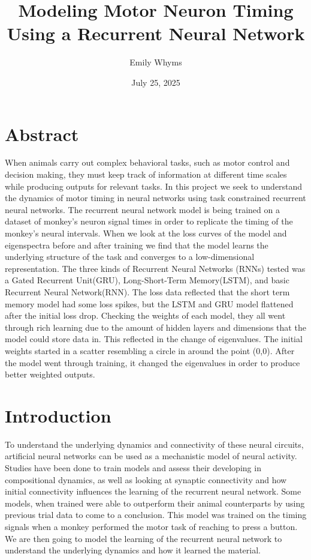 \documentclass{article}
\title{\bf \fontsize{25 pt}{25 pt} Modeling Motor Neuron Timing Using a Recurrent Neural Network}
\author{Emily Whyms}
\date{July 25, 2025}
\begin{document}
\maketitle

\section{Abstract\centering}
  When animals carry out complex behavioral tasks, such as motor control and decision making, they must keep track of information at different time scales while producing outputs for relevant tasks. In this project we seek to understand the dynamics of motor timing in neural networks using task constrained recurrent neural networks. The recurrent neural network model is being trained on a dataset\cite{Wang2018} of monkey's neuron signal times in order to replicate the timing of the monkey's neural intervals. When we look at the loss curves of the model and eigenspectra before and after training we find that the model learns the underlying structure of the task and converges to a low-dimensional representation. The three kinds of Recurrent Neural Networks (RNNs) tested was a Gated Recurrent Unit(GRU), Long-Short-Term Memory(LSTM), and basic Recurrent Neural Network(RNN). The loss data reflected that the short term memory model had some loss spikes, but the LSTM and GRU model flattened after the initial loss drop. Checking the weights of each model, they all went through rich learning due to the amount of hidden layers and dimensions that the model could store data in. This reflected in the change of eigenvalues. The initial weights started in a scatter resembling a circle in around the point (0,0). After the model went through training, it changed the eigenvalues in order to produce better weighted outputs.
\section{Introduction\centering}
To understand the underlying dynamics and connectivity of these neural circuits, artificial neural networks can be used as a mechanistic model of neural activity. Studies have been done to train models and assess their developing in compositional dynamics\cite{guilhot2024dynamicalsimilarityanalysisidentify}, as well as looking at synaptic connectivity and how initial connectivity influences the learning of the recurrent neural network\cite{liu2025influenceinitialconnectivitybiologically}. Some models, when trained were able to outperform their animal counterparts by using previous trial data to come to a conclusion\cite{Molano-Mazón2023}. This model was trained on the timing signals when a monkey performed the motor task of reaching to press a button\cite{Wang2018}. We are then going to model the learning of the recurrent neural network to understand the underlying dynamics and how it learned the material.
\end{document}

